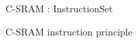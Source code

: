 \begin{Frame}{C-SRAM : InstructionSet}
    \begin{block}{C-SRAM instruction principle}
    \end{block}
\end{Frame}
